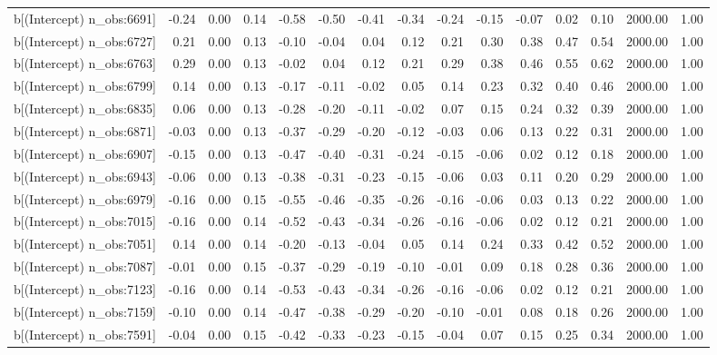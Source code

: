 \begin{table}[ht]
\begin{tabular}{rrrrrrrrrrrrrrr}
  b[(Intercept) n\_obs:6691] & -0.24 & 0.00 & 0.14 & -0.58 & -0.50 & -0.41 & -0.34 & -0.24 & -0.15 & -0.07 & 0.02 & 0.10 & 2000.00 & 1.00 \\ 
  b[(Intercept) n\_obs:6727] & 0.21 & 0.00 & 0.13 & -0.10 & -0.04 & 0.04 & 0.12 & 0.21 & 0.30 & 0.38 & 0.47 & 0.54 & 2000.00 & 1.00 \\ 
  b[(Intercept) n\_obs:6763] & 0.29 & 0.00 & 0.13 & -0.02 & 0.04 & 0.12 & 0.21 & 0.29 & 0.38 & 0.46 & 0.55 & 0.62 & 2000.00 & 1.00 \\ 
  b[(Intercept) n\_obs:6799] & 0.14 & 0.00 & 0.13 & -0.17 & -0.11 & -0.02 & 0.05 & 0.14 & 0.23 & 0.32 & 0.40 & 0.46 & 2000.00 & 1.00 \\ 
  b[(Intercept) n\_obs:6835] & 0.06 & 0.00 & 0.13 & -0.28 & -0.20 & -0.11 & -0.02 & 0.07 & 0.15 & 0.24 & 0.32 & 0.39 & 2000.00 & 1.00 \\ 
  b[(Intercept) n\_obs:6871] & -0.03 & 0.00 & 0.13 & -0.37 & -0.29 & -0.20 & -0.12 & -0.03 & 0.06 & 0.13 & 0.22 & 0.31 & 2000.00 & 1.00 \\ 
  b[(Intercept) n\_obs:6907] & -0.15 & 0.00 & 0.13 & -0.47 & -0.40 & -0.31 & -0.24 & -0.15 & -0.06 & 0.02 & 0.12 & 0.18 & 2000.00 & 1.00 \\ 
  b[(Intercept) n\_obs:6943] & -0.06 & 0.00 & 0.13 & -0.38 & -0.31 & -0.23 & -0.15 & -0.06 & 0.03 & 0.11 & 0.20 & 0.29 & 2000.00 & 1.00 \\ 
  b[(Intercept) n\_obs:6979] & -0.16 & 0.00 & 0.15 & -0.55 & -0.46 & -0.35 & -0.26 & -0.16 & -0.06 & 0.03 & 0.13 & 0.22 & 2000.00 & 1.00 \\ 
  b[(Intercept) n\_obs:7015] & -0.16 & 0.00 & 0.14 & -0.52 & -0.43 & -0.34 & -0.26 & -0.16 & -0.06 & 0.02 & 0.12 & 0.21 & 2000.00 & 1.00 \\ 
  b[(Intercept) n\_obs:7051] & 0.14 & 0.00 & 0.14 & -0.20 & -0.13 & -0.04 & 0.05 & 0.14 & 0.24 & 0.33 & 0.42 & 0.52 & 2000.00 & 1.00 \\ 
  b[(Intercept) n\_obs:7087] & -0.01 & 0.00 & 0.15 & -0.37 & -0.29 & -0.19 & -0.10 & -0.01 & 0.09 & 0.18 & 0.28 & 0.36 & 2000.00 & 1.00 \\ 
  b[(Intercept) n\_obs:7123] & -0.16 & 0.00 & 0.14 & -0.53 & -0.43 & -0.34 & -0.26 & -0.16 & -0.06 & 0.02 & 0.12 & 0.21 & 2000.00 & 1.00 \\ 
  b[(Intercept) n\_obs:7159] & -0.10 & 0.00 & 0.14 & -0.47 & -0.38 & -0.29 & -0.20 & -0.10 & -0.01 & 0.08 & 0.18 & 0.26 & 2000.00 & 1.00 \\ 
  b[(Intercept) n\_obs:7591] & -0.04 & 0.00 & 0.15 & -0.42 & -0.33 & -0.23 & -0.15 & -0.04 & 0.07 & 0.15 & 0.25 & 0.34 & 2000.00 & 1.00 \\ 

\end{tabular}
\end{table}
